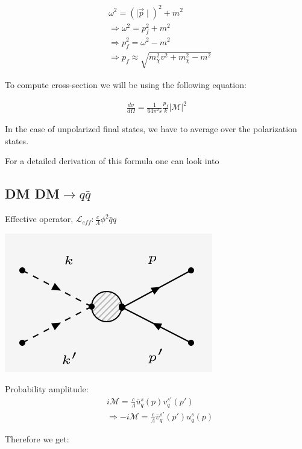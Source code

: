\documentclass[12pt]{report}
\begin{document}
\begin{eqnarray}
&\omega^2 = (\mid \vec{p} \mid)^2 + m^2 \\
& \Rightarrow \omega^2 = p_f^2+ m^2\\
&\Rightarrow p_f^2= \omega^2 - m^2 \\
& \Rightarrow p_f \approx \sqrt{m_\chi^2 v^2 + m_\chi^2 -m^2}
\end{eqnarray}

To compute cross-section we will be using the following equation:

\begin{align}
\frac{d\sigma}{d\Omega}= \frac{1}{64 \pi^2 s} \frac{p_f}{k} |\mathcal{M}|^2 \label{cross}
\end{align}

In the case of unpolarized final states, we have to average over the polarization states.


For a detailed derivation of this formula one can look into \cite{pes}


\subsection{DM DM$\longrightarrow q \bar{q}$}
 Effective operator, $\mathscr{L}_{eff} : \frac{c}{\Lambda} \phi^2 \bar{q}q$
\begin{center}
\includegraphics[scale=0.5]{qqbar.png}
\end{center}


Probability amplitude:
\begin{align*}
& i \mathcal{M}= \frac{c}{\Lambda} \bar{u}^s_q(p)v^{s\prime}_q(p\prime)\\
&\Rightarrow -i \mathcal{M} = \frac{c}{\Lambda} \bar{v}_q^{s\prime}(p\prime) u^s_q(p)
\end{align*}

Therefore we get:
\end{document}
